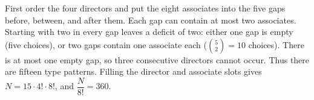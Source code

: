 First order the four directors and put the eight associates into the five gaps before, between, and after them. Each gap can contain at most two associates. Starting with two in every gap leaves a deficit of two: either one gap is empty (five choices), or two gaps contain one associate each ($\binom52=10$ choices). There is at most one empty gap, so three consecutive directors cannot occur. Thus there are fifteen type patterns. Filling the director and associate slots gives $N=15\cdot4!\cdot8!$, and $\boxed{\dfrac{N}{8!}=360}$.
